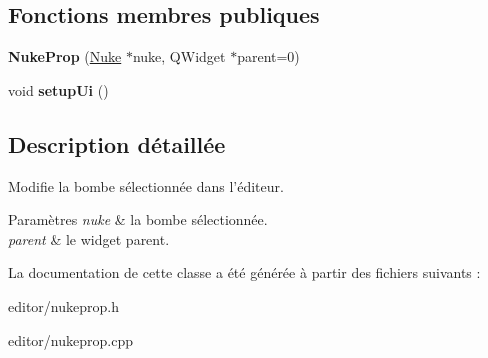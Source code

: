 \subsection*{Fonctions membres publiques}
\begin{DoxyCompactItemize}
\item 
\hypertarget{classNukeProp_a2e11beb43353c8ccbdfe1d8ba7eb61a6}{{\bfseries Nuke\+Prop} (\hyperlink{classNuke}{Nuke} $\ast$nuke, Q\+Widget $\ast$parent=0)}\label{classNukeProp_a2e11beb43353c8ccbdfe1d8ba7eb61a6}

\item 
\hypertarget{classNukeProp_a4f9fd54eecaba08172d134599908ecf9}{void {\bfseries setup\+Ui} ()}\label{classNukeProp_a4f9fd54eecaba08172d134599908ecf9}

\end{DoxyCompactItemize}


\subsection{Description détaillée}
Modifie la bombe sélectionnée dans l’éditeur. 


\begin{DoxyParams}{Paramètres}
{\em nuke} & la bombe sélectionnée. \\
\hline
{\em parent} & le widget parent. \\
\hline
\end{DoxyParams}


La documentation de cette classe a été générée à partir des fichiers suivants \+:\begin{DoxyCompactItemize}
\item 
editor/nukeprop.\+h\item 
editor/nukeprop.\+cpp\end{DoxyCompactItemize}
